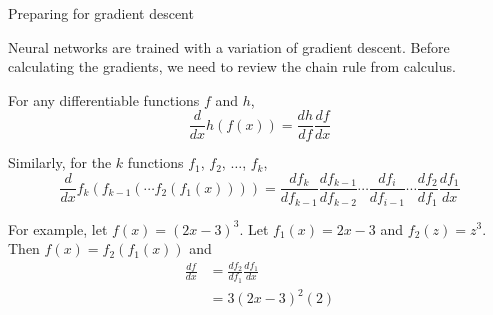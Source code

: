 \documentclass[9pt]{beamer}
\begin{document}
\begin{frame}{Preparing for gradient descent}

Neural networks are trained with a variation of gradient descent. Before calculating the gradients, we need to review the chain rule from calculus.

\bigskip
\pause
For any differentiable functions $f$ and $h$,
\[ \frac{d}{dx}h(f(x)) = \frac{dh}{df}\frac{df}{dx} \]

\pause
Similarly, for the $k$ functions $f_1$, $f_2$, $\ldots$, $f_k$,
\[ \frac{d}{dx}f_k(f_{k-1}(\cdots f_2(f_1(x)))) = \frac{df_k}{df_{k-1}} \frac{df_{k-1}}{df_{k-2}}\cdots \frac{df_i}{df_{i-1}}\cdots \frac{df_2}{df_1}\frac{df_1}{dx} \]

\pause
For example, let $f(x) = (2x-3)^3$. Let $f_1(x) = 2x-3$ and $f_2(z) = z^3$. Then $f(x) = f_2(f_1(x))$ and
\begin{align*}
	\frac{df}{dx} &= \frac{df_2}{df_1}\frac{df_1}{dx} \\
		&= 3(2x-3)^2(2)
\end{align*}
\end{frame}
\end{document}
